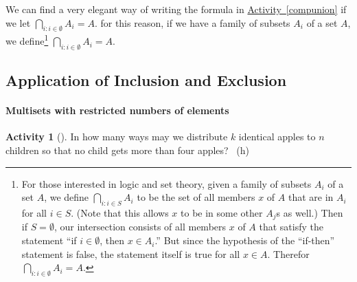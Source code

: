 \documentclass[10pt,]{book}
\theoremstyle{plain}
\theoremstyle{definition}
\theoremstyle{definition}
\theoremstyle{definition}
\newtheorem{activity}[project]{Activity}
\numberwithin{equation}{chapter}
\begin{document}
We can find a very elegant way of writing the formula in \hyperref[compunion]{Activity~\ref{compunion}} if we let \(\bigcap_{i:i\in\emptyset}A_i = A\).  for this reason, if we have a family of subsets \(A_i\) of a set \(A\), we define\footnote{For those interested in logic and set theory, given a family of subsets \(A_i\) of a set \(A\), we define \(\bigcap_{i:i\in S}A_i\) to be the set of all members \(x\) of \(A\) that are in \(A_i\) for all \(i \in S\).  (Note that this allows \(x\) to be in some other \(A_j\)s as well.)  Then if \(S = \emptyset\), our intersection consists of all members \(x\) of \(A\) that satisfy the statement ``if \(i\in \emptyset\), then \(x \in A_i\).'' But since the hypothesis of the ``if-then'' statement is false, the statement itself is true for all \(x \in A\).  Therefor \(\bigcap_{i:i \in \emptyset}A_i = A\).\label{fn-12}} \(\bigcap_{i:i\in\emptyset}A_i = A\).%
\typeout{************************************************}
\typeout{************************************************}
\subsection[{Application of Inclusion and Exclusion}]{Application of Inclusion and Exclusion}\label{subsection-29}
\typeout{************************************************}
\typeout{************************************************}
\paragraph[{Multisets with restricted numbers of elements}]{Multisets with restricted numbers of elements}\hypertarget{paragraphs-4}{}
\begin{activity}[]\label{act_restrictedmultisetspie}
\hypertarget{p-1205}{}%
In how many ways may we distribute \(k\) identical apples to \(n\) children so that no child gets more than four apples?%
~{\tiny (h)}\end{activity}
\typeout{************************************************}
\typeout{************************************************}
\end{document}
